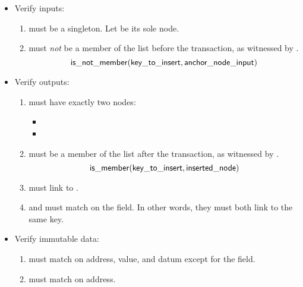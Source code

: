 \documentclass[../midgard.tex]{subfiles}
\begin{document}
\begin{description}
\begin{itemize}
            \item Verify inputs:
            \begin{enumerate}[resume]
                \item {} must be a singleton.
                  Let  be its sole node.
                \item {} must \emph{not} be a member of the list before the transaction, as witnessed by .
                    \begin{equation*}
                        \mathsf{is\_not\_member} (\mathsf{key\_to\_insert}, \mathsf{anchor\_node\_input})
                    \end{equation*}
            \end{enumerate}
            
            \item Verify outputs:
            \begin{enumerate}[resume]
                \item {} must have exactly two nodes:
                    \begin{itemize}
                        \item {}
                        \item {}  
                    \end{itemize}
                \item {} must be a member of the list after the transaction, as witnessed by .
                    \begin{equation*}
                        \mathsf{is\_member} (\mathsf{key\_to\_insert}, \mathsf{inserted\_node})
                    \end{equation*}
                \item {} must link to .
                \item {} and  must match on the  field.
                  In other words, they must both link to the same key.
            \end{enumerate}
            
            \item Verify immutable data:
            \begin{enumerate}[resume]
                \item {} must match  on address, value, and datum except for the  field.
                \item {} must match  on address.
            \end{enumerate}
        \end{itemize}
        

\end{description}
\end{document}
